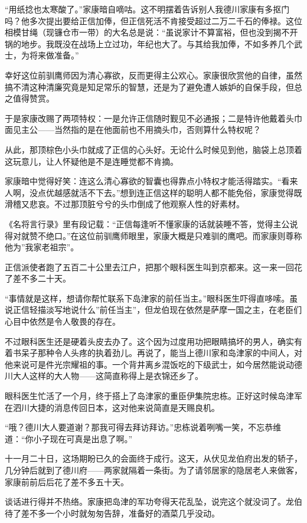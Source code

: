 \documentclass[
]{article}
\begin{document}
``用纸捻也太寒酸了。''家康暗自嘀咕。这不明摆着告诉别人我德川家康有多抠门吗？他多次提出要给正信加俸，但正信死活不肯接受超过二万二千石的俸禄。这位相模甘绳（现镰仓市一带）的大名总是说：``虽说家计不算富裕，但也没到揭不开锅的地步。我既没在战场上立过功，年纪也大了。与其给我加俸，不如多养几个武士，为将来做准备。''

幸好这位前驯鹰师因为清心寡欲，反而更得主公欢心。家康很欣赏他的自律，虽然搞不清这种清廉究竟是知足常乐的智慧，还是为了避免遭人嫉妒的自保手段，但总之值得赞赏。

于是家康改赐了两项特权：一是允许正信随时觐见不必通报；二是特许他戴着头巾面见主公------当然指的是在他面前也不用摘头巾，否则算什么特权呢？

从此，那顶棕色小头巾就成了正信的心头好。无论什么时候见到他，脑袋上总顶着这玩意儿，让人怀疑他是不是连睡觉都不肯摘。

家康暗中觉得好笑：连这么清心寡欲的智囊也得靠点小特权才能活得踏实。``看来人啊，没点优越感就活不下去。''想到连正信这样的聪明人都不能免俗，家康觉得既滑稽又悲哀。不过那顶脏兮兮的头巾倒成了他观察人性的好素材。

《名将言行录》里有段记载：``正信每逢听不懂家康的话就装睡不答，觉得主公说得对就赞不绝口。''在这位前驯鹰师眼里，家康大概是只难驯的鹰吧。而家康则尊称他为''我家老祖宗''。

正信派使者跑了五百二十公里去江户，把那个眼科医生叫到京都来。这一来一回花了差不多二十天。

``事情就是这样，想请你帮忙联系下岛津家的前任当主。''眼科医生吓得直哆嗦。虽说正信轻描淡写地说什么''前任当主''，但龙伯现在依然是萨摩一国之主，在老臣们心目中依然是令人敬畏的存在。

不过眼科医生还是硬着头皮去办了。这个因为过度用功把眼睛搞坏的男人，确实有着书呆子那种令人头疼的执着劲儿。再说了，能当上德川家和岛津家的中间人，对他来说可是件光宗耀祖的事。一个背井离乡混饭吃的下级武士，如今居然能说动德川大人这样的大人物------这简直称得上是衣锦还乡了。

眼科医生忙活了一个月，终于搭上了岛津家的重臣伊集院忠栋。正好这时候岛津军在泗川大捷的消息传回日本，这对他来说简直是天赐良机。

``哦？德川大人要道谢？那我可得去拜访拜访。''忠栋说着咧嘴一笑，不忘恭维道：``你小子现在可真是出息了啊。''

十一月二十日，这场期盼已久的会面终于成行。这天，从伏见龙伯府出发的轿子，几分钟后就到了德川府------两家就隔着一条街。为了请邻居家的隐居老人来做客，家康前前后后花了差不多五十天。

谈话进行得并不热络。家康把岛津的军功夸得天花乱坠，说完这个就没词了。龙伯待了差不多一个小时就匆匆告辞，准备好的酒菜几乎没动。
\end{document}
